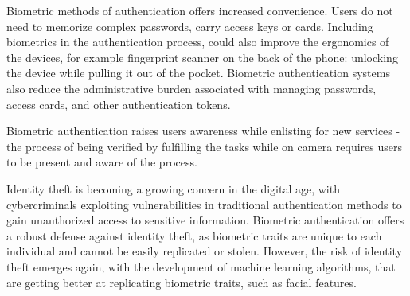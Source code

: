     Biometric methods of authentication offers increased convenience. Users do not need to
    memorize complex passwords, carry access keys or cards. Including biometrics in the authentication process,
    could also improve the ergonomics of the devices, for example fingerprint scanner on the back of the phone:
    unlocking the device while pulling it out of the pocket. Biometric authentication systems also reduce the
    administrative burden associated with managing passwords, access cards, and other authentication tokens.

    Biometric authentication raises users awareness while enlisting for new services - the process of being
    verified by fulfilling the tasks while on camera requires users to be present and aware of the process.

    Identity theft is becoming a growing concern in the digital age, with cybercriminals exploiting vulnerabilities
    in traditional authentication methods to gain unauthorized access to sensitive information. Biometric authentication
    offers a robust defense against identity theft, as biometric traits are unique to each individual and cannot be easily
    replicated or stolen. However, the risk of identity theft emerges again, with the development of machine learning
    algorithms, that are getting better at replicating biometric traits, such as facial features.